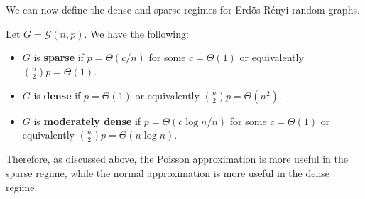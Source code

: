 \documentclass{article}
\begin{document}
We can now define the dense and sparse regimes for Erd\"os-R\'enyi random graphs.

\begin{definition}
    Let $G=\mathcal{G}(n,p)$. We have the following:
    \begin{itemize}
        \item $G$ is \textbf{sparse} if $p=\Theta(c/n)$ for some $c=\Theta(1)$ or equivalently $\binom{n}{2}p=\Theta(1)$.
        \item $G$ is \textbf{dense} if $p=\Theta(1)$ or equivalently $\binom{n}{2}p=\Theta(n^2)$.
        \item $G$ is \textbf{moderately dense} if $p=\Theta(c\log n/n)$ for some $c=\Theta(1)$ or equivalently $\binom{n}{2}p=\Theta(n\log n)$.
    \end{itemize}
\end{definition}

Therefore, as discussed above, the Poisson approximation is more useful in the sparse regime, while the normal approximation is more useful in the dense regime.  


\newpage


\end{document}
